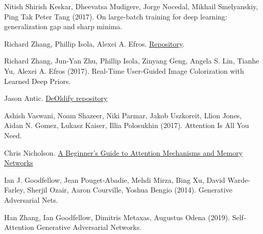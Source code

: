 \documentclass[twoside,twocolumn]{article}
\begin{document}
\begin{thebibliography}{99}
Nitish Shirish Keskar, Dheevatsa Mudigere, Jorge Nocedal, Mikhail Smelyanskiy, Ping Tak Peter Tang (2017).
\newblock On large-batch training for deep learning: generalization gap and sharp minima.

Richard Zhang, Phillip Isola, Alexei A. Efros.
\newblock \href{https://github.com/richzhang/colorization}{Repository}.

Richard Zhang, Jun-Yan Zhu, Phillip Isola, Zinyang Geng, Angela S. Lin, Tianhe Yu, Alexei A. Efros (2017).
\newblock Real-Time User-Guided Image Colorization with Learned Deep Priors.

Jason Antic.
\newblock \href{https://github.com/jantic/DeOldify}{DeOldify repository}

Ashish Vaswani, Noam Shazeer, Niki Parmar, Jakob Uszkoreit, Llion Jones, Aidan N. Gomez, Lukasz Kaiser, Illia Polosukhin (2017).
\newblock Attention Is All You Need.

Chris Nicholson.
\newblock \href{https://skymind.ai/wiki/attention-mechanism-memory-network}{A Beginner's Guide to Attention Mechanisms and Memory Networks}

Ian J. Goodfellow, Jean Pouget-Abadie, Mehdi Mirza, Bing Xu, David Warde-Farley,
Sherjil Ozair, Aaron Courville, Yoshua Bengio (2014).
\newblock Generative Adversarial Nets.

Han Zhang, Ian Goodfellow, Dimitris Metaxas, Augustus Odena (2019).
\newblock Self-Attention Generative Adversarial Networks.



\end{thebibliography}

\end{document}
